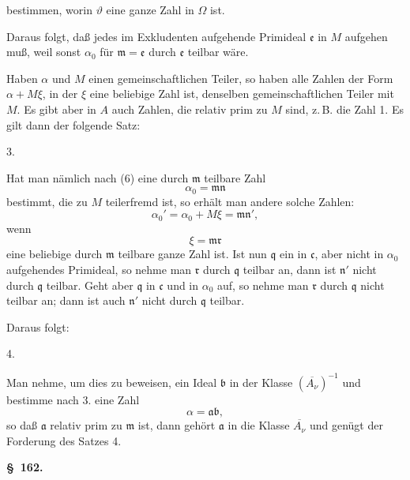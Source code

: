 bestimmen, worin $\vartheta$ eine ganze Zahl in $\Omega$ ist.

Daraus folgt, daß jedes im Exkludenten aufgehende Primideal
 $\mathfrak{e}$ in $M$ aufgehen muß, weil sonst $\alpha_0$ für $\mathfrak{m} = \mathfrak{e}$ durch $\mathfrak{e}$
teilbar wäre.

Haben $\alpha$ und $M$ einen gemeinschaftlichen Teiler, so haben
alle Zahlen der Form $\alpha + M\xi$, in der $\xi$ eine beliebige Zahl ist,
denselben gemeinschaftlichen Teiler mit $M$. Es gibt aber in $A$
auch Zahlen, die relativ prim zu $M$ sind, z.\,B. die Zahl 1. Es
gilt dann der folgende Satz:

3. 

Hat man nämlich nach (6) eine durch $\mathfrak{m}$ teilbare Zahl
\[
\alpha_0 = \mathfrak{m}\mathfrak{n}
\]
bestimmt, die zu $M$ teilerfremd ist, so erhält man andere solche
Zahlen:
\[
\alpha_0' = \alpha_0 + M\xi = \mathfrak{m}\mathfrak{n}',
\]
wenn
\[
\xi = \mathfrak{m}\mathfrak{r}
\]
eine beliebige durch $\mathfrak{m}$ teilbare ganze Zahl ist. Ist nun $\mathfrak{q}$ ein in $\mathfrak{c}$,
aber nicht in $\alpha_0$ aufgehendes Primideal, so nehme man $\mathfrak{r}$ durch
$\mathfrak{q}$ teilbar an, dann ist $\mathfrak{n}'$ nicht durch $\mathfrak{q}$ teilbar. Geht aber $\mathfrak{q}$ in $\mathfrak{c}$
und in $\alpha_0$ auf, so nehme man $\mathfrak{r}$ durch $\mathfrak{q}$ nicht teilbar an; dann
ist auch $\mathfrak{n}'$ nicht durch $\mathfrak{q}$ teilbar.

Daraus folgt:

4. 

Man nehme, um dies zu beweisen, ein Ideal $\mathfrak{b}$ in der Klasse
$(\overline{A_\nu})^{-1}$ und bestimme nach 3. eine Zahl
\[
\alpha = \mathfrak{a}\mathfrak{b},
\]
so daß $\mathfrak{a}$ relativ prim zu $\mathfrak{m}$ ist, dann gehört $\mathfrak{a}$ in die Klasse $\overline{A_\nu}$
und genügt der Forderung des Satzes 4.

\noindent\textbf{\S\ 162.\qquad {}}

